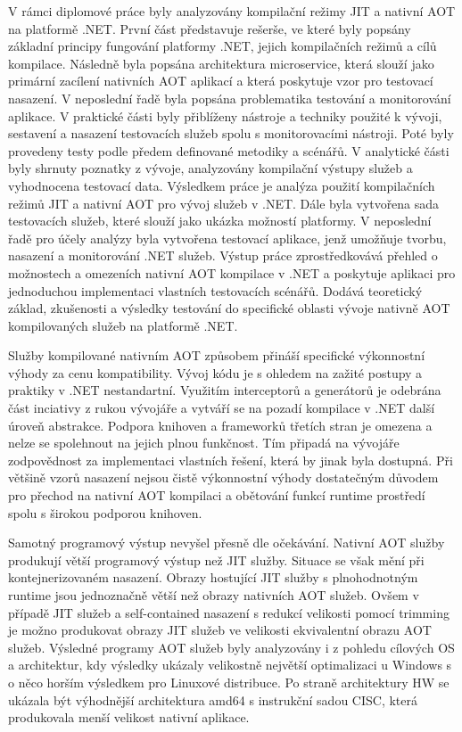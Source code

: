 
V rámci diplomové práce byly analyzovány kompilační režimy JIT a nativní AOT na platformě .NET. První část představuje rešerše, ve které byly popsány základní principy fungování platformy .NET, jejich kompilačních režimů a cílů kompilace. Následně byla popsána architektura microservice, která slouží jako primární zacílení nativních AOT aplikací a která poskytuje vzor pro testovací nasazení. V neposlední řadě byla popsána problematika testování a monitorování aplikace. V praktické části byly přiblíženy nástroje a techniky použité k vývoji, sestavení a nasazení testovacích služeb spolu s monitorovacími nástroji. Poté byly provedeny testy podle předem definované metodiky a scénářů. V analytické části byly shrnuty poznatky z vývoje, analyzovány kompilační výstupy služeb a vyhodnocena testovací data. Výsledkem práce je analýza použití kompilačních režimů JIT a nativní AOT pro vývoj služeb v .NET. Dále byla vytvořena sada testovacích služeb, které slouží jako ukázka možností platformy. V neposlední řadě pro účely analýzy byla vytvořena testovací aplikace, jenž umožňuje tvorbu, nasazení a monitorování .NET služeb. Výstup práce zprostředkovává přehled o možnostech a omezeních nativní AOT kompilace v .NET a poskytuje aplikaci pro jednoduchou implementaci vlastních testovacích scénářů. Dodává teoretický základ, zkušenosti a výsledky testování do specifické oblasti vývoje nativně AOT kompilovaných služeb na platformě .NET.

Služby kompilované nativním AOT způsobem přináší specifické výkonnostní výhody za cenu kompatibility. Vývoj kódu je s ohledem na zažité postupy a praktiky v .NET nestandartní. Využitím interceptorů a generátorů je odebrána část inciativy z rukou vývojáře a vytváří se na pozadí kompilace v .NET další úroveň abstrakce. Podpora knihoven a frameworků třetích stran je omezena a nelze se spolehnout na jejich plnou funkčnost. Tím připadá na vývojáře zodpovědnost za implementaci vlastních řešení, která by jinak byla dostupná. Při většině vzorů nasazení nejsou čistě výkonnostní výhody dostatečným důvodem pro přechod na nativní AOT kompilaci a obětování funkcí runtime prostředí spolu s širokou podporou knihoven.

Samotný programový výstup nevyšel přesně dle očekávání. Nativní AOT služby produkují větší programový výstup než JIT služby. Situace se však mění při kontejnerizovaném nasazení. Obrazy hostující JIT služby s plnohodnotným runtime jsou jednoznačně větší než obrazy nativních AOT služeb. Ovšem v případě JIT služeb a self-contained nasazení s redukcí velikosti pomocí trimming je možno produkovat obrazy JIT služeb ve velikosti ekvivalentní obrazu AOT služeb. Výsledné programy AOT služeb byly analyzovány i z pohledu cílových OS a architektur, kdy výsledky ukázaly velikostně největší optimalizaci u Windows s o něco horším výsledkem pro Linuxové distribuce. Po straně architektury HW se ukázala být výhodnější architektura amd64 s instrukční sadou CISC, která produkovala menší velikost nativní aplikace.


